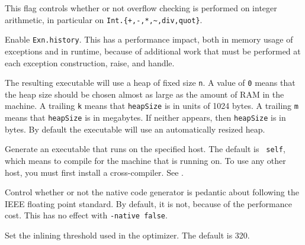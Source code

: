 \begin{description}

This flag controls whether or not overflow checking is performed on integer
arithmetic, in particular on {\tt Int.\{+,-,*,\~{},div,quot\}}.

%


Enable {\tt Exn.history}.  This has a performance impact, both in memory usage
of exceptions and in runtime, because of additional work that must be performed
at each exception construction, raise, and handle.

The resulting executable will use a heap of fixed size {\tt n}.  A value
of {\tt 0} means that the heap size should be chosen almost as large as the
amount of
RAM in the machine.  A trailing {\tt k} means that {\tt heapSize} is in units of
1024 bytes.  A trailing {\tt m} means that {\tt heapSize} is in megabytes.  If
neither appears, then {\tt heapSize} is in bytes.  By default the executable
will use an automatically resized heap.

Generate an executable that runs on the specified host.  The default is {\tt
self}, which means to compile for the machine that {\mlton} is running on.  To
use any other host, you must first install a cross-compiler.  See
.

Control whether or not the native code generator is pedantic about following
the IEEE floating point standard.  By default, it is not, because of the
performance cost.  This has no effect with {\tt -native false}.


Set the inlining threshold used in the optimizer.  The default is 320.



\end{description}
